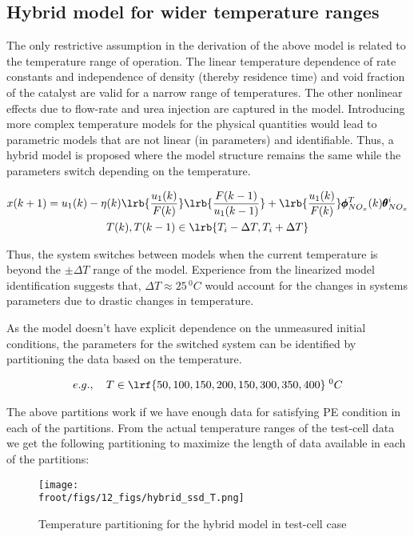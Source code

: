 \subsection{Hybrid model for wider temperature ranges}

The only restrictive assumption in the derivation of the above model is related to the temperature range of operation.
The linear temperature dependence of rate constants and independence of density (thereby residence time) and void
fraction of the catalyst are valid for a narrow range of temperatures. The other nonlinear effects due to flow-rate and
urea injection are captured in the model. Introducing more complex temperature models for the physical quantities would
lead to parametric models that are not linear (in parameters) and identifiable. Thus, a hybrid model is proposed where
the model structure remains the same while the parameters switch depending on the temperature.

\begin{multline}
        x(k+1) = u_1(k) - \eta(k) \lrb{\frac{u_1(k)}{F(k)}} \lrb{\frac{F(k-1)}{u_1(k-1)}}
                        + \lrb{\frac{u_1(k)}{F(k)}} \pmb \phi^{T}_{NO_x}(k) \pmb \theta^i_{NO_x}
        \\
        T(k), T(k-1) \in \lrb{T_i-\Delta T, T_i + \Delta T}
\end{multline}

Thus, the system switches between models when the current temperature is beyond the $\pm \Delta T$ range of the model.
Experience from the linearized model identification suggests that, $\Delta T \approx 25 \, ^0C$ would account for
the changes in systems parameters due to drastic changes in temperature.

As the model doesn't have explicit dependence on the unmeasured initial conditions, the parameters for the switched system can be identified by partitioning the data based on the temperature.

\begin{align}
        e.g., \quad T \in \lrf{50, 100, 150, 200, 150, 300, 350, 400} \; ^0C
\end{align}

The above partitions work if we have enough data for satisfying PE condition in each of the partitions. From the actual temperature ranges of the test-cell data we get the following partitioning to maximize the length of data available in each of the partitions:


\begin{figure}[H]
        \centering
        \texttt{[image: \\froot/figs/12\_figs/hybrid\_ssd\_T.png]}
        \caption{Temperature partitioning for the hybrid model in test-cell case}
\end{figure}

